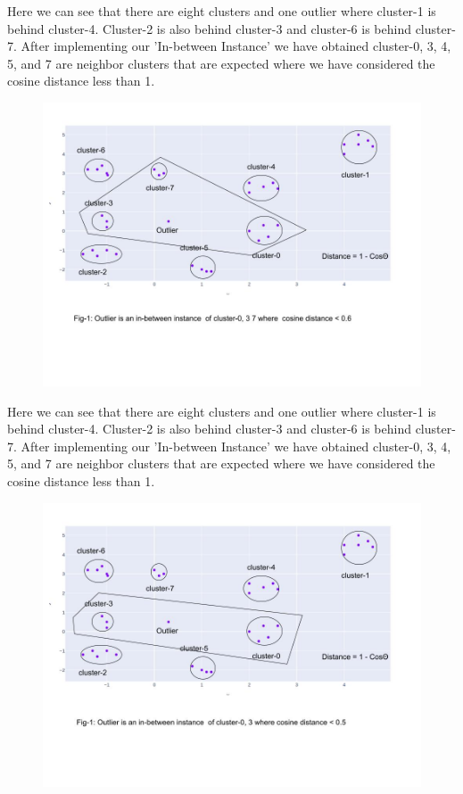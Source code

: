 \documentclass[11pt]{article}
\theoremstyle{definition}
\begin{document}
\noindent Here we can see that there are eight clusters and one outlier where cluster-1 is behind cluster-4. Cluster-2 is also behind cluster-3 and cluster-6 is behind cluster-7. After implementing our 'In-between Instance' we have obtained cluster-0, 3, 4, 5, and 7  are neighbor clusters that are expected where we have considered the cosine distance less than 1.
\begin{figure}[H]
\centering
\includegraphics[scale=.5]{images/angle-.6.jpg}\\
\end{figure}
\noindent Here we can see that there are eight clusters and one outlier where cluster-1 is behind cluster-4. Cluster-2 is also behind cluster-3 and cluster-6 is behind cluster-7. After implementing our 'In-between Instance' we have obtained cluster-0, 3, 4, 5, and 7  are neighbor clusters that are expected where we have considered the cosine distance less than 1.
\begin{figure}[H]
\centering
\includegraphics[scale=.5]{images/angle-.5.jpg}\\
\end{figure}
\end{document}
